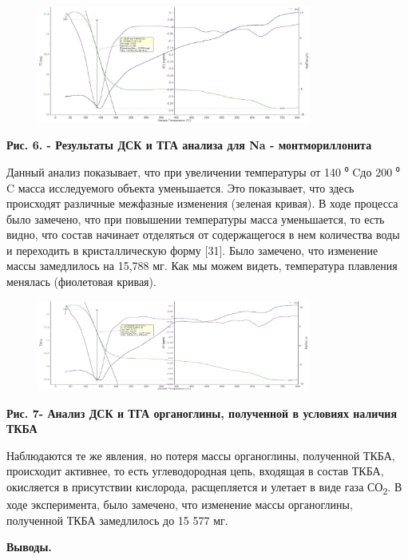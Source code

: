 \begin{figure}[H]
	\centering
	\includegraphics[width=0.8\textwidth]{assets/1031}
	\caption*{}
\end{figure}

{\bfseries Рис. 6. - Результаты ДСК и ТГА анализа для Na - монтмориллонита}

Данный анализ показывает, что при увеличении температуры от 140 ⁰ Cдо
200 ⁰ C масса исследуемого объекта уменьшается. Это показывает, что
здесь происходят различные межфазные изменения (зеленая кривая). В ходе
процесса было замечено, что при повышении температуры масса уменьшается,
то есть видно, что состав начинает отделяться от содержащегося в нем
количества воды и переходить в кристаллическую форму {[}31{]}. Было
замечено, что изменение массы замедлилось на 15,788 мг. Как мы можем
видеть, температура плавления менялась (фиолетовая кривая).

\begin{figure}[H]
	\centering
	\includegraphics[width=0.8\textwidth]{assets/1032}
	\caption*{}
\end{figure}

{\bfseries Рис. 7- Анализ ДСК и ТГА органоглины, полученной в условиях
наличия ТКБА}

Наблюдаются те же явления, но потеря массы органоглины, полученной ТКБА,
происходит активнее, то есть углеводородная цепь, входящая в состав
ТКБА, окисляется в присутствии кислорода, расщепляется и улетает в виде
газа СО\textsubscript{2}. В ходе эксперимента, было замечено, что
изменение массы органоглины, полученной ТКБА замедлилось до 15 577 мг.

{\bfseries Выводы.}

